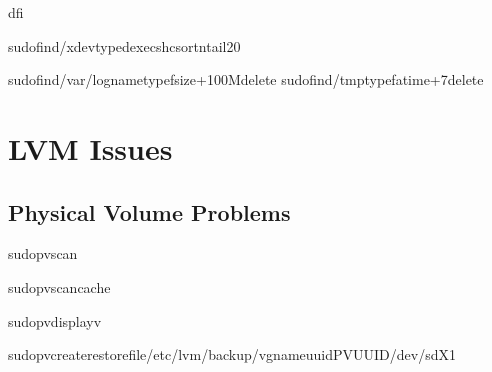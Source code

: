 \documentclass[letterpaper,10pt,english]{sphinxmanual}
\begin{document}
\sphinxAtStartPar
{}

\begin{sphinxVerbatim}[commandchars=\\\{\}]
df\PYGZhy{}i

sudofind/\PYGZhy{}xdev\PYGZhy{}typed\PYGZhy{}execsh\PYGZhy{}c\PYGZus{}sort\PYGZhy{}ntail\PYGZhy{}20

sudofind/var/log\PYGZhy{}name\PYGZhy{}typef\PYGZhy{}size+100M\PYGZhy{}delete
sudofind/tmp\PYGZhy{}typef\PYGZhy{}atime+7\PYGZhy{}delete
\end{sphinxVerbatim}


\section{LVM Issues}
\label{\detokenize{troubleshooting:lvm-issues}}

\subsection{Physical Volume Problems}
\label{\detokenize{troubleshooting:physical-volume-problems}}
\sphinxAtStartPar
{}

\begin{sphinxVerbatim}[commandchars=\\\{\}]
sudopvscan

sudopvscan\PYGZhy{}\PYGZhy{}cache

sudopvdisplay\PYGZhy{}v

sudopvcreate\PYGZhy{}\PYGZhy{}restorefile/etc/lvm/backup/vg\PYGZus{}name\PYGZhy{}\PYGZhy{}uuidPV\PYGZus{}UUID/dev/sdX1
\end{sphinxVerbatim}
\end{document}
